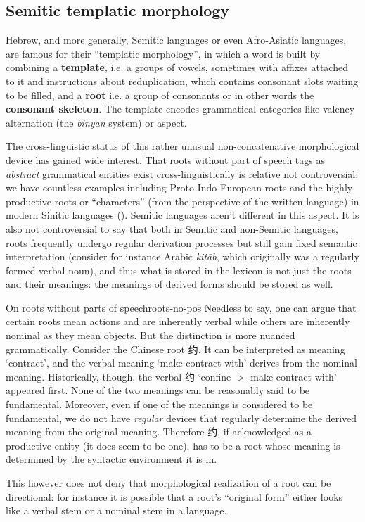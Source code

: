 \documentclass[a4paper, oneside, 12pt]{report}
\newcommand*{\textgt}{$>$ }
\newcommand*{\concept}[1]{\textbf{#1}}
\newcommand{\form}[1]{\emph{#1}}
\newcommand{\translate}[1]{`#1'}
\begin{document}
\subsection{Semitic templatic morphology}

Hebrew, and more generally, Semitic languages or even Afro-Asiatic languages,
are famous for their ``templatic morphology'',
in which a word is built by combining a \concept{template},
i.e. a groups of vowels, sometimes with affixes attached to it and instructions about reduplication,
which contains consonant slots waiting to be filled,
and a \concept{root} i.e. a group of consonants or in other words the \concept{consonant skeleton}.
The template encodes grammatical categories like valency alternation
(the \form{binyan} system) or aspect.

The cross-linguistic status of this rather unusual non-concatenative morphological device has gained wide interest.
That roots without part of speech tags as \emph{abstract} grammatical entities exist cross-linguistically
is relative not controversial:
we have countless examples including Proto-Indo-European roots
and the highly productive roots or ``characters'' (from the perspective of the written language) in modern Sinitic languages
().
Semitic languages aren't different in this aspect.
It is also not controversial to say that both in Semitic and non-Semitic languages,
roots frequently undergo regular derivation processes
but still gain fixed semantic interpretation
(consider for instance Arabic \form{kitāb}, which originally was a regularly formed verbal noun),
and thus what is stored in the lexicon is not just the roots and their meanings:
the meanings of derived forms should be stored as well.

\begin{theorybox}{On roots without parts of speech}{roots-no-pos}
    Needless to say, one can argue that certain roots mean actions and are inherently verbal
    while others are inherently nominal as they mean objects.
    But the distinction is more nuanced grammatically.
    Consider the Chinese root 约.
    It can be interpreted as meaning \translate{contract},
    and the verbal meaning \translate{make contract with} derives from the nominal meaning.
    Historically, though, the verbal 约 \translate{confine \textgt make contract with} appeared first.
    None of the two meanings can be reasonably said to be fundamental.
    Moreover, even if one of the meanings is considered to be fundamental,
    we do not have \emph{regular} devices that regularly determine the derived meaning from the original meaning.
    Therefore 约, if acknowledged as a productive entity (it does seem to be one),
    has to be a root whose meaning is determined by the syntactic environment it is in.

    This however does not deny that morphological realization of a root can be directional:
    for instance it is possible that a root's ``original form''
    either looks like a verbal stem or a nominal stem in a language. 
\end{theorybox}
\end{document}
